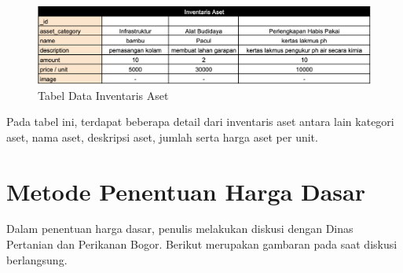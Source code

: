 \begin{spacing}{1.5}
\begin{enumerate}
	\begin{figure}[H]
		\centering
		\includegraphics[width=1\textwidth]{gambar/tabel_inventaris_aset.png}
		\caption{Tabel Data Inventaris Aset}
	\end{figure}	

	Pada tabel ini, terdapat beberapa detail dari inventaris aset antara lain kategori aset, nama aset, deskripsi aset, jumlah serta harga aset per unit.

\end{enumerate}

\section{Metode Penentuan Harga Dasar}

Dalam penentuan harga dasar, penulis melakukan diskusi dengan Dinas Pertanian dan Perikanan Bogor. Berikut merupakan gambaran pada saat diskusi berlangsung.



\end{spacing}
